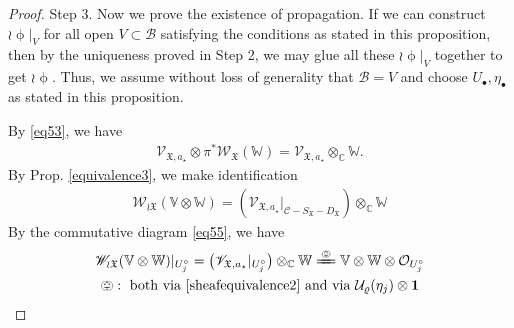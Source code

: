 \documentclass[11pt,b5paper,notitlepage]{article}
\theoremstyle{definition}
\theoremstyle{plain}
\newcommand{\fk}{\mathfrak}
\newcommand{\mc}{\mathcal}
\newcommand{\idt}{\mathbf{1}}
\newcommand{\SV}{\mathscr{V}}
\newcommand{\SX}{{S_{\fk X}}}
\newcommand{\DX}{D_{\fk X}}
\newcommand{\blt}{\bullet}
\newcommand{\Vbb}{\mathbb V}
\newcommand{\Wbb}{\mathbb W}
\newcommand{\Cbb}{\mathbb C}
\newcommand{\<}{\left\langle}
\renewcommand{\>}{\right\rangle}
\newcommand{\MO}{\mathcal{O}}
\newcommand{\MC}{\mathcal{C}}
\newcommand{\MB}{\mathcal{B}}
\newcommand{\fx}{\mathfrak{X}}
\newcommand{\SW}{\mathscr{W}}
\numberwithin{equation}{section}
\begin{document}
\begin{proof}
Step 3. Now we prove the existence of propagation. If we can construct $\wr\upphi|_V$ for all open $V\subset\mc B$ satisfying the conditions as stated in this proposition, then by the uniqueness proved in Step 2, we may glue all these $\wr\upphi|_V$ together to get $\wr\upphi$. Thus,  we assume without loss of generality that $\mc B=V$  and choose $U_\blt,\eta_\blt$ as stated in this proposition.


By \eqref{eq53}, we have
\begin{align}\label{eq54}
        \SV_{\fx,a_\star}\otimes \pi^*\SW_\fx(\Wbb)=\SV_{\fx,a_\star}\otimes_\Cbb \Wbb.
\end{align}
By Prop. \ref{equivalence3}, we make identification
\begin{align}\label{eq61}
\SW_{\wr\fx}(\Vbb\otimes \Wbb)=(\SV_{\fx,a_\star}|_{\mc C-\SX-\DX})\otimes_\Cbb \Wbb
\end{align}
By the commutative diagram \eqref{eq55}, we have
\begin{gather}\label{eq56}
\begin{gathered}
\SW_{\wr\fx}(\Vbb\otimes \Wbb)|_{U_j^\circ}=\big(\SV_{\fx,a_\star}|_{U_j^\circ}\big)\otimes_\Cbb \Wbb\xlongequal{\pumpkin}\Vbb\otimes\Wbb\otimes\mc O_{U_j^\circ}\\
\pumpkin:\text{ both via \eqref{sheafequivalence2} and via }\mc U_\varrho(\eta_j)\otimes \idt
\end{gathered}
\end{gather}



\end{proof}
\end{document}

